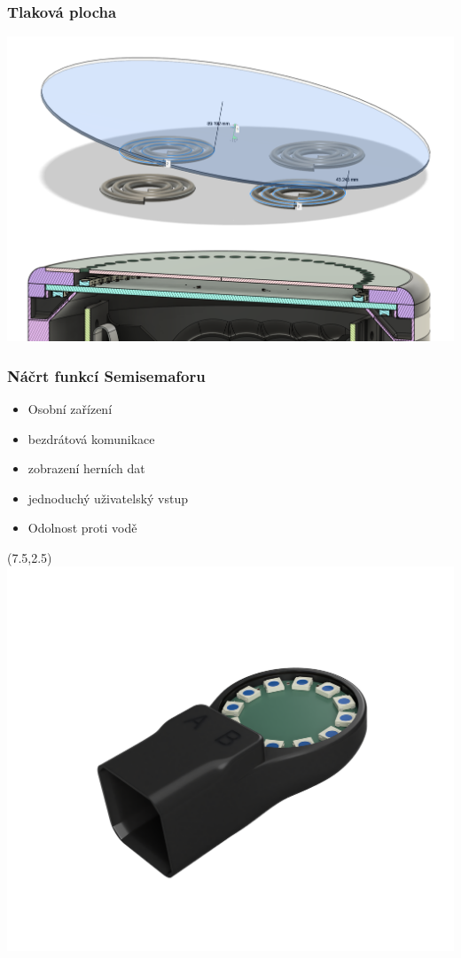 \documentclass[%
  12pt,       				%
	t,                  %
	aspectratio=1610,   %
	unicode,						%
]{beamer}				    	%
\begin{document}
\begin{frame} 
	\frametitle{Tlaková plocha}
	\centering
	\includegraphics[width=0.8\columnwidth]{text/PraktickaCast/img/tlakovka-kombo.png}
\end{frame} 

\begin{frame} 
	\frametitle{Náčrt funkcí Semisemaforu}
	\vspace{10mm}
	\begin{itemize}
		\item Osobní zařízení
		\item bezdrátová komunikace
		\item zobrazení herních dat
		\item jednoduchý uživatelský vstup
		\item Odolnost proti vodě
	\end{itemize}

	\begin{textblock}{8}(7.5,2.5)
		\includegraphics[width=\columnwidth]{text/PraktickaCast/img/SemiSemafor-BOX-render.png}
	\end{textblock}
\end{frame} 
\end{document}
